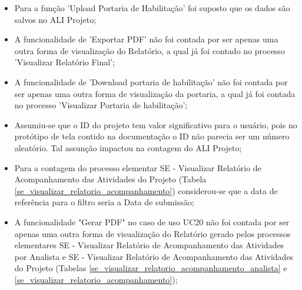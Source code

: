   \begin{itemize}
   \item Para a função 'Upload Portaria de Habilitação' foi suposto que os dados são salvos no ALI Projeto;
   
   \item A funcionalidade de 'Exportar PDF' não foi contada por ser apenas uma outra forma de visualização do Relatório, a qual já foi contado
   no processo 'Visualizar Relatório Final';
   
   \item A funcionalidade de 'Download portaria de habilitação' não foi contada por ser apenas uma outra forma de visualização da portaria, a qual
   já foi contada no processo 'Visualizar Portaria de habilitação';
   
   \item Assumiu-se que o ID do projeto tem valor significativo para o usuário, pois no protótipo de tela contido na documentação o ID não 
    parecia ser um número aleatório. Tal assunção impactou na contagem do ALI Projeto;
   
   \item Para a contagem do processo elementar SE - Visualizar Relatório de Acompanhamento das Atividades do Projeto
    (Tabela \ref{se_visualizar_relatorio_acompanhamento}) considerou-se que a data de referência para o filtro seria a Data de submissão;
    
   \item A funcionalidade "Gerar PDF" no caso de uso UC20 não foi contada por ser apenas uma outra forma de visualização do Relatório gerado
     pelos processos elementares SE - Visualizar Relatório de Acompanhamento das Atividades por Analista e 
     SE - Visualizar Relatório de Acompanhamento das Atividades do Projeto
     (Tabelas \ref{se_visualizar_relatorio_acompanhamento_analista} e \ref{se_visualizar_relatorio_acompanhamento});
  \end{itemize}

